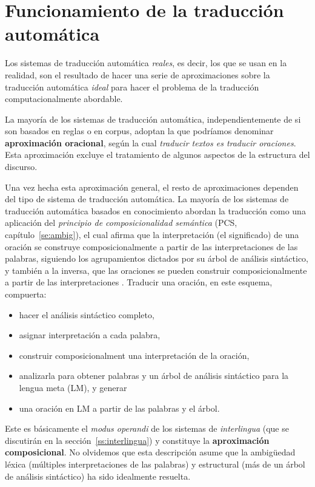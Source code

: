\section{Funcionamiento de la traducción automática} \label{se:aprox} 

Los sistemas de traducción automática \emph{reales}, es decir, los que se usan en la realidad, son el resultado de hacer una serie de aproximaciones sobre la traducción automática \emph{ideal} para hacer el problema de la traducción computacionalmente abordable. 

La mayoría de los sistemas de traducción automática, independientemente de si son basados en reglas o en corpus, adoptan la que podríamos denominar \textbf{aproximación oracional}, según la cual \emph{traducir textos es traducir oraciones}. Esta aproximación excluye el tratamiento de algunos aspectos de la estructura del discurso. 

Una vez hecha esta aproximación general, el resto de aproximaciones dependen del tipo de sistema de traducción automática. La mayoría de los sistemas de traducción automática basados en conocimiento abordan la traducción como una aplicación del \emph{principio de composicionalidad semántica} (PCS, capítulo~\ref{se:ambig}), el cual afirma que la interpretación (el significado) de una oración se construye composicionalmente a partir de las interpretaciones de las palabras, siguiendo los agrupamientos dictados por su árbol de análisis sintáctico, y también a la inversa, que las oraciones se pueden construir composicionalmente a partir de las interpretaciones \citep{tellier00p}. Traducir una oración, en este esquema, compuerta: \begin{itemize} \item hacer el análisis sintáctico completo, \item asignar interpretación a cada palabra, \item construir composicionalment una interpretación de la oración, \item analizarla para obtener palabras y un árbol de análisis sintáctico para la lengua meta (LM), y generar \item una oración en LM a partir de las palabras y el árbol. \end{itemize} Este es básicamente el \emph{modus operandi} de los sistemas de \emph{interlingua} (que se discutirán en la sección~\ref{ss:interlingua}) y constituye la \textbf{aproximación composicional}. No olvidemos que esta descripción asume que la ambigüedad léxica (múltiples interpretaciones de las palabras) y estructural (más de un árbol de análisis sintáctico) ha sido idealmente resuelta. 

